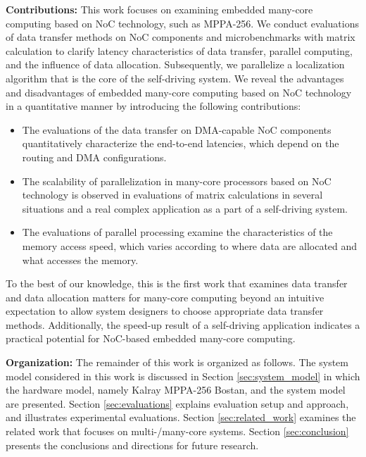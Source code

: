\textbf{Contributions:}
This work focuses on examining embedded many-core computing based on NoC technology, such as MPPA-256.
We conduct evaluations of data transfer methods on NoC components and microbenchmarks with matrix calculation to clarify latency characteristics of data transfer, parallel computing, and the influence of data allocation.
Subsequently, we parallelize a localization algorithm that is the core of the self-driving system.
We reveal the advantages and disadvantages of embedded many-core computing based on NoC technology in a quantitative manner by introducing the following contributions:

\begin{itemize}
  \setlength{\leftskip}{-5mm}
  \item The evaluations of the data transfer on DMA-capable NoC components quantitatively characterize the end-to-end latencies, which depend on the routing and DMA configurations.
  \item The scalability of parallelization in many-core processors based on NoC technology is observed in evaluations of matrix calculations in several situations and a real complex application as a part of a self-driving system.
  \item The evaluations of parallel processing examine the characteristics of the memory access speed, which varies according to where data are allocated and what accesses the memory.
\end{itemize}
  
To the best of our knowledge, this is the first work that examines data transfer and data allocation matters for many-core computing beyond an intuitive expectation to allow system designers to choose appropriate data transfer methods.
Additionally, the speed-up result of a self-driving application indicates a practical potential for NoC-based embedded many-core computing.

\textbf{Organization:}
The remainder of this work is organized as follows.
The system model considered in this work is discussed in Section \ref{sec:system_model} in which the hardware model, namely Kalray MPPA-256 Bostan, and the system model are presented.
Section \ref{sec:evaluations} explains evaluation setup and approach, and illustrates experimental evaluations.
Section \ref{sec:related_work} examines the related work that focuses on multi-/many-core systems.
Section \ref{sec:conclusion} presents the conclusions and directions for future research.


